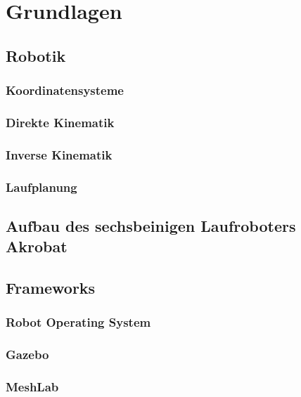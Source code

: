 \chapter{Grundlagen}

\section{Robotik}

\subsection{Koordinatensysteme}
\subsection{Direkte Kinematik}
\subsection{Inverse Kinematik}
\subsection{Laufplanung}

\section{Aufbau des sechsbeinigen Laufroboters Akrobat}

\section{Frameworks}

\subsection{Robot Operating System}
\subsection{Gazebo}
\subsection{MeshLab}